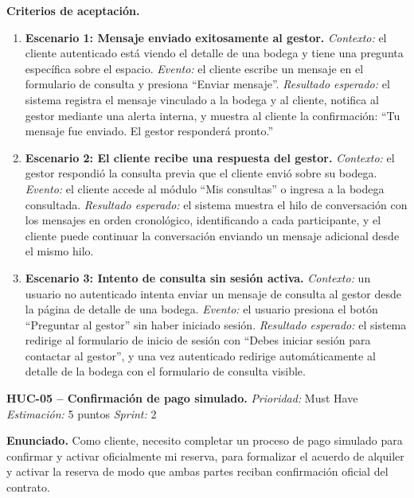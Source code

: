 \textbf{Criterios de aceptación.}
\begin{enumerate}
\item \textbf{Escenario 1: Mensaje enviado exitosamente al gestor.} \textit{Contexto:} el cliente autenticado está viendo el detalle de una bodega y tiene una pregunta específica sobre el espacio. \textit{Evento:} el cliente escribe un mensaje en el formulario de consulta y presiona ``Enviar mensaje''. \textit{Resultado esperado:} el sistema registra el mensaje vinculado a la bodega y al cliente, notifica al gestor mediante una alerta interna, y muestra al cliente la confirmación: ``Tu mensaje fue enviado. El gestor responderá pronto.''
\item \textbf{Escenario 2: El cliente recibe una respuesta del gestor.} \textit{Contexto:} el gestor respondió la consulta previa que el cliente envió sobre su bodega. \textit{Evento:} el cliente accede al módulo ``Mis consultas'' o ingresa a la bodega consultada. \textit{Resultado esperado:} el sistema muestra el hilo de conversación con los mensajes en orden cronológico, identificando a cada participante, y el cliente puede continuar la conversación enviando un mensaje adicional desde el mismo hilo.
\item \textbf{Escenario 3: Intento de consulta sin sesión activa.} \textit{Contexto:} un usuario no autenticado intenta enviar un mensaje de consulta al gestor desde la página de detalle de una bodega. \textit{Evento:} el usuario presiona el botón ``Preguntar al gestor'' sin haber iniciado sesión. \textit{Resultado esperado:} el sistema redirige al formulario de inicio de sesión con ``Debes iniciar sesión para contactar al gestor'', y una vez autenticado redirige automáticamente al detalle de la bodega con el formulario de consulta visible.
\end{enumerate}

\textbf{HUC-05 -- Confirmación de pago simulado.} \label{req:HUC-05}
\textit{Prioridad:} Must Have \quad \textit{Estimación:} 5 puntos \quad \textit{Sprint:} 2

\textbf{Enunciado.} Como cliente, necesito completar un proceso de pago simulado para confirmar y activar oficialmente mi reserva, para formalizar el acuerdo de alquiler y activar la reserva de modo que ambas partes reciban confirmación oficial del contrato.

